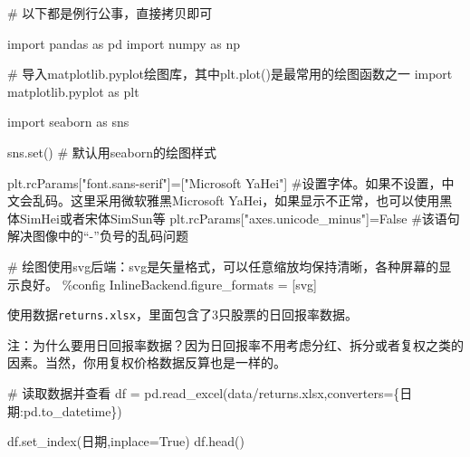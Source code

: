 \documentclass[
  letterpaper,
  DIV=11,
  numbers=noendperiod]{scrreprt}
\newenvironment{Shaded}{\begin{snugshade}}{\end{snugshade}}
\newcommand{\BuiltInTok}[1]{\textcolor[rgb]{0.00,0.23,0.31}{#1}}
\newcommand{\CommentTok}[1]{\textcolor[rgb]{0.37,0.37,0.37}{#1}}
\newcommand{\ImportTok}[1]{\textcolor[rgb]{0.00,0.46,0.62}{#1}}
\newcommand{\NormalTok}[1]{\textcolor[rgb]{0.00,0.23,0.31}{#1}}
\newcommand{\OperatorTok}[1]{\textcolor[rgb]{0.37,0.37,0.37}{#1}}
\newcommand{\StringTok}[1]{\textcolor[rgb]{0.13,0.47,0.30}{#1}}
\newcommand{\VariableTok}[1]{\textcolor[rgb]{0.07,0.07,0.07}{#1}}
\begin{document}
\begin{Shaded}
\begin{Highlighting}[]
\CommentTok{\# 以下都是例行公事，直接拷贝即可}

\ImportTok{import}\NormalTok{ pandas }\ImportTok{as}\NormalTok{ pd}
\ImportTok{import}\NormalTok{ numpy }\ImportTok{as}\NormalTok{ np }

\CommentTok{\# 导入matplotlib.pyplot绘图库，其中plt.plot()是最常用的绘图函数之一}
\ImportTok{import}\NormalTok{ matplotlib.pyplot }\ImportTok{as}\NormalTok{ plt }

\ImportTok{import}\NormalTok{ seaborn }\ImportTok{as}\NormalTok{ sns}

\NormalTok{sns.}\BuiltInTok{set}\NormalTok{() }\CommentTok{\# 默认用seaborn的绘图样式}

\NormalTok{plt.rcParams[}\StringTok{"font.sans{-}serif"}\NormalTok{]}\OperatorTok{=}\NormalTok{[}\StringTok{"Microsoft YaHei"}\NormalTok{] }\CommentTok{\#设置字体。如果不设置，中文会乱码。这里采用微软雅黑\textquotesingle{}Microsoft YaHei\textquotesingle{}，如果显示不正常，也可以使用黑体\textquotesingle{}SimHei\textquotesingle{}或者宋体\textquotesingle{}SimSun\textquotesingle{}等}
\NormalTok{plt.rcParams[}\StringTok{"axes.unicode\_minus"}\NormalTok{]}\OperatorTok{=}\VariableTok{False} \CommentTok{\#该语句解决图像中的“{-}”负号的乱码问题}

\CommentTok{\# 绘图使用\textquotesingle{}svg\textquotesingle{}后端：svg是矢量格式，可以任意缩放均保持清晰，各种屏幕的显示良好。}
\OperatorTok{\%}\NormalTok{config InlineBackend.figure\_formats }\OperatorTok{=}\NormalTok{ [}\StringTok{\textquotesingle{}svg\textquotesingle{}}\NormalTok{]}
\end{Highlighting}
\end{Shaded}

使用数据\texttt{returns.xlsx}，里面包含了3只股票的日回报率数据。

注：为什么要用日回报率数据？因为日回报率不用考虑分红、拆分或者复权之类的因素。当然，你用复权价格数据反算也是一样的。

\begin{Shaded}
\begin{Highlighting}[]
\CommentTok{\#  读取数据并查看}
\NormalTok{df }\OperatorTok{=}\NormalTok{ pd.read\_excel(}\StringTok{\textquotesingle{}data/returns.xlsx\textquotesingle{}}\NormalTok{,converters}\OperatorTok{=}\NormalTok{\{}\StringTok{\textquotesingle{}日期\textquotesingle{}}\NormalTok{:pd.to\_datetime\})}

\NormalTok{df.set\_index(}\StringTok{\textquotesingle{}日期\textquotesingle{}}\NormalTok{,inplace}\OperatorTok{=}\VariableTok{True}\NormalTok{)}
\NormalTok{df.head() }
\end{Highlighting}
\end{Shaded}
\end{document}
